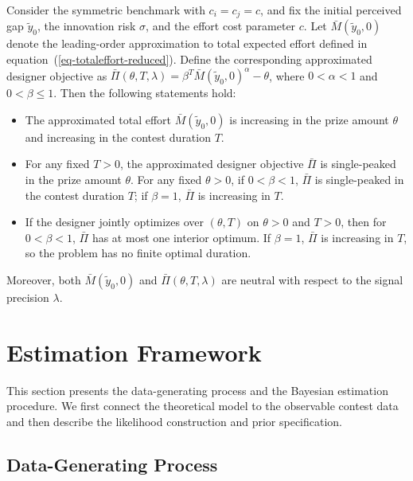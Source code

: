 \documentclass[mnsc]{informs3}
\begin{document}
\begin{proposition}\label{prop-monotonicity-M}
Consider the symmetric benchmark with $c_i=c_j=c$, and fix the initial perceived gap $\tilde y_0$, the innovation risk $\sigma$, and the effort cost parameter $c$. 
Let $\bar M(\tilde y_0,0)$ denote the leading-order approximation to total expected effort defined in equation~(\ref{eq-totaleffort-reduced}).
Define the corresponding approximated designer objective as $\bar\Pi(\theta,T,\lambda)=\beta^T \bar M(\tilde y_0,0)^\alpha-\theta$, where $0<\alpha<1$ and $0<\beta\leq 1$.
Then the following statements hold:
\begin{itemize}
	\item [(1)] The approximated total effort $\bar{M}(\tilde y_0,0)$ is increasing in the prize amount $\theta$ and increasing in the contest duration $T$.

	\item [(2)] For any fixed $T>0$, the approximated designer objective $\bar\Pi$ is single-peaked in the prize amount $\theta$. For any fixed $\theta>0$, if $0<\beta<1$, $\bar\Pi$ is single-peaked in the contest duration $T$; if $\beta=1$, $\bar\Pi$ is increasing in $T$.

    \item[(3)] If the designer jointly optimizes over $(\theta,T)$ on $\theta>0$ and $T>0$, then for $0<\beta<1$, $\bar\Pi$ has at most one interior optimum. If $\beta=1$, $\bar\Pi$ is increasing in $T$, so the problem has no finite optimal duration.
\end{itemize}
Moreover, both $\bar M(\tilde y_0,0)$ and $\bar\Pi(\theta,T,\lambda)$ are neutral with respect to
the signal precision $\lambda$.
\end{proposition}






\section{Estimation Framework}\label{sect-bayes-framework}

This section presents the data-generating process and the Bayesian estimation procedure.
We first connect the theoretical model to the observable contest data and then describe the likelihood construction and prior specification.

\subsection{Data-Generating Process}
\end{document}
